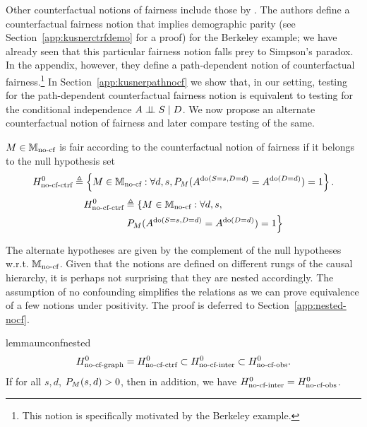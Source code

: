 Other counterfactual notions of fairness include those by \citet{KusnerLRS17}. The authors define a counterfactual fairness notion that implies demographic parity (see Section~\ref{app:kusnerctrfdemo} for a proof) for the Berkeley example; we have already seen that this particular fairness notion falls prey to Simpson's paradox. In the appendix, however, they define a path-dependent notion of counterfactual fairness.\footnote{This notion is specifically motivated by the Berkeley example.} In Section~\ref{app:kusnerpathnocf} we show that, in our setting, testing for the path-dependent counterfactual fairness notion is equivalent to testing for the conditional independence $A \perp\!\!\!\perp S \mid D$. We now propose an alternate counterfactual notion of fairness and later compare testing of the same.


\begin{definition}\label{def:ctrf-nocf}
$M \in \mathbb{M}_{\text{no-cf}}$ is fair according to the counterfactual notion of fairness if it belongs to the null hypothesis set
\ifdefined\SINGLE
\begin{equation*}\label{eq:nullctrf}
    H^0_{\text{no-cf-ctrf}} \triangleq \left \lbrace M \in \mathbb{M}_{\text{no-cf}}: \forall d, s, P_M(A^{\text{do}(S=s,D=d)} = A^{\text{do}(D=d)}) = 1 \right \rbrace.
\end{equation*}
\else
\begin{align*}\label{eq:nullctrf}
    H^0_{\text{no-cf-ctrf}} &\triangleq \left \lbrace M \in \mathbb{M}_{\text{no-cf}}:\forall d, s,  \right. \nonumber\\
    &\left. P_M(A^{\text{do}(S=s,D=d)} = A^{\text{do}(D=d)}) = 1 \right \rbrace
\end{align*}
\fi
\end{definition}
The alternate hypotheses are given by the complement of the null hypotheses w.r.t. $\mathbb{M}_{\text{no-cf}}$. Given that the notions are defined on different rungs of the causal hierarchy, it is perhaps not surprising that they are nested accordingly. The assumption of no confounding simplifies the relations as we can prove equivalence of a few notions under positivity. The proof is deferred to Section~\ref{app:nested-nocf}.
\begin{restatable}{lemma}{unconfnested}\label{lem:notion_equiv}
\begin{equation*}H^0_{\text{no-cf-graph}} = H^0_{\text{no-cf-ctrf}} \subset H^0_{\text{no-cf-inter}} \subset H^0_{\text{no-cf-obs}}.\end{equation*}
If for all $s,d$, $P_{M}(s,d) > 0$, then in addition, we have $H^0_{\text{no-cf-inter}} = H^0_{\text{no-cf-obs}}$.
\end{restatable}

